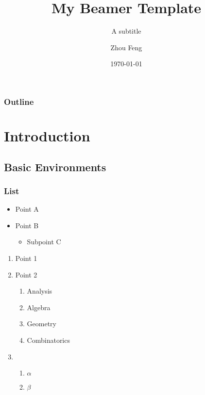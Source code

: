 \documentclass{beamer}
\title[Short Title]{My Beamer Template}
\subtitle{A subtitle}
\author[Z. Feng]{Zhou Feng}
\institute[CUHK]{The Chinese University of Hong Kong}
\date{\today}
\begin{document}
	
\begin{frame}[plain]
	\maketitle
\end{frame}

\begin{frame}\label{contents}
	\frametitle{Outline}
	\tableofcontents
\end{frame}


\section{Introduction} \label{sec:intro}

\subsection{Basic Environments}
\begin{frame}
	\frametitle{List}
	\begin{itemize}
		\item Point A
		\item Point B
		      \begin{itemize}
			      \item Subpoint C
		      \end{itemize}
	\end{itemize}

	\begin{enumerate}
		\item Point 1 \pause
		\item Point 2
		      \begin{enumerate}[I]
			      \item Analysis
			      \item Algebra
			      \item Geometry
			      \item Combinatorics
		      \end{enumerate}
		\item
		      \begin{enumerate}[i]
			      \item $ \alpha $
			      \item $ \beta $
		      \end{enumerate}
	\end{enumerate}

\end{frame}
\end{document}
